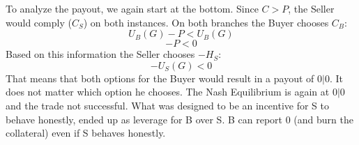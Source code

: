 \documentclass{cacthesis}
\begin{document}
To analyze the payout, we again start at the bottom. Since $C>P$, the Seller would comply ($C_S$) on both instances.\newline
On both branches the Buyer chooses $C_B$: \[U_B(G)-P < U_B(G)\] \[-P < 0\]
Based on this information the Seller chooses $-H_S$: \[-U_S(G) < 0\]
That means that both options for the Buyer would result in a payout of $0|0$. It does not matter which option he chooses.\newline
The Nash Equilibrium is again at $0|0$ and the trade not successful.\newline
What was designed to be an incentive for S to behave honestly, ended up as leverage for B over S. B can report 0 (and burn the collateral) even if S behaves honestly. 
\end{document}
